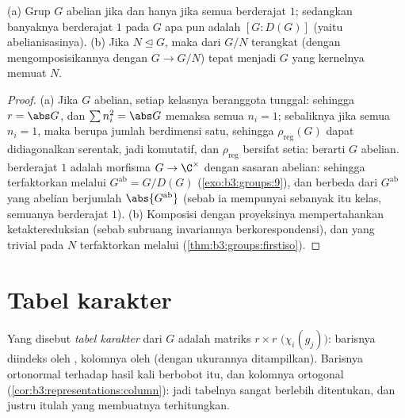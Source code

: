\begin{proposition}
\label{prop:b3:representations:onedim}
(a) Grup $G$ abelian jika dan hanya jika semua 
berderajat $1$; sedangkan banyaknya  berderajat $1$ pada $G$ apa pun adalah
$[G : D(G)]$ (yaitu  abelianisasinya).
(b) Jika $N \trianglelefteq G$, maka  dari
$G/N$ terangkat (dengan mengomposisikannya dengan $G \to G/N$) tepat menjadi
 $G$ yang kernelnya memuat $N$.
\end{proposition}

\begin{proof}
(a) Jika $G$ abelian, setiap kelasnya beranggota tunggal: sehingga $r = \abs G$,
dan $\sum n_i^2 = \abs G$ memaksa semua $n_i = 1$; sebaliknya jika
semua $n_i = 1$, maka  berupa jumlah 
berdimensi satu, sehingga $\rho_{\mathrm{reg}}(G)$ dapat
didiagonalkan serentak, jadi komutatif, dan
$\rho_{\mathrm{reg}}$ bersifat setia: berarti $G$ abelian. 
berderajat $1$ adalah morfisma $G \to \C^\times$ dengan sasaran abelian:
sehingga terfaktorkan melalui $G^{\mathrm{ab}} = G/D(G)$
(\cref{exo:b3:groups:9}), dan  berbeda dari $G^{\mathrm{ab}}$
yang abelian berjumlah $\abs{G^{\mathrm{ab}}}$ (sebab ia mempunyai sebanyak
itu kelas, semuanya berderajat $1$). (b) Komposisi dengan
proyeksinya mempertahankan ketaktereduksian (sebab subruang invariannya
berkorespondensi), dan  yang trivial pada $N$ terfaktorkan melalui
 (\cref{thm:b3:groups:firstiso}).
\end{proof}

\section{Tabel karakter}

\begin{definition}\label{def:b3:representations:table}
Yang disebut \emph{tabel karakter} dari $G$ adalah
matriks $r \times r$ $\bigl(\chi_i(g_j)\bigr)$: barisnya diindeks oleh
 , kolomnya oleh  (dengan ukurannya
ditampilkan). Barisnya ortonormal terhadap hasil kali berbobot itu, dan
kolomnya ortogonal (\cref{cor:b3:representations:column}): jadi
tabelnya sangat berlebih ditentukan, dan justru itulah yang membuatnya
terhitungkan.
\end{definition}

